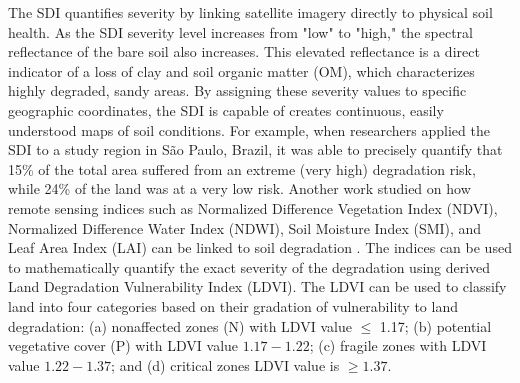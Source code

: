 \documentclass[11pt,letterpaper]{article}
\theoremstyle{plain}
\theoremstyle{definition}
\theoremstyle{remark}
\begin{document}
The SDI quantifies severity by linking satellite imagery directly to physical soil health. As the SDI severity level increases from "low" to "high," the spectral reflectance of the bare soil also increases. This elevated reflectance is a direct indicator of a loss of clay and soil organic matter (OM), which characterizes highly degraded, sandy areas. 
By assigning these severity values to specific geographic coordinates, the SDI is capable of creates continuous, easily understood maps of soil conditions. For example, when researchers applied the SDI to a study region in São Paulo, Brazil, it was able to precisely quantify that 15\% of the total area suffered from an extreme (very high) degradation risk, while 24\% of the land was at a very low risk. Another work studied on how remote sensing indices such as Normalized Difference Vegetation Index (NDVI), Normalized Difference Water Index (NDWI), Soil Moisture Index (SMI), and Leaf Area Index (LAI) can be linked to soil degradation \cite{chandramohan2024evaluating}. The indices can be used to mathematically quantify the exact severity of the degradation using derived Land Degradation Vulnerability Index (LDVI). The LDVI can be used to classify land into four categories based on their gradation of vulnerability to land degradation: (a) nonaffected zones (N) with LDVI value $\leq$ 1.17; (b) potential vegetative cover (P) with LDVI value $1.17 - 1.22$; (c) fragile zones with LDVI value $1.22 - 1.37$; and (d) critical zones LDVI value is $\geq 1.37$.
\end{document}
